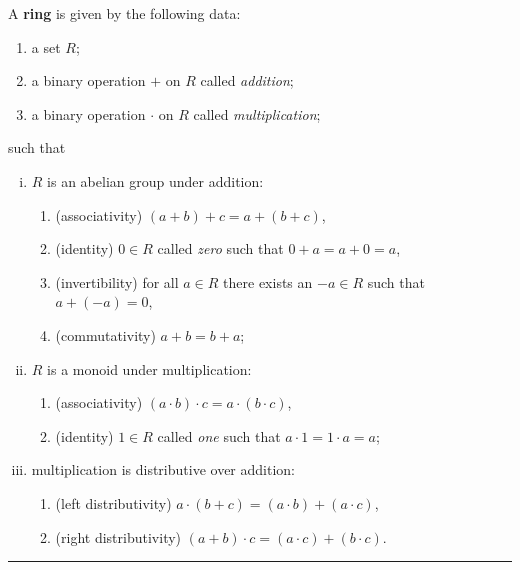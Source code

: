 \documentclass[12pt]{article}
\newcommand{\keyword}[1]{\textbf{#1}}
\newcommand{\sepline}{\rule{\textwidth}{0.4pt}}
\theoremstyle{definition}
\newcommand{\<}{\left\langle}
\renewcommand{\>}{\right\rangle}
\begin{document}
A \keyword{ring} is given by the following data:
\begin{enumerate}[(1)]
    \item a set $R$;
    \item a binary operation $+$ on $R$ called \emph{addition};
    \item a binary operation $\cdot$ on $R$ called \emph{multiplication};
\end{enumerate}
such that
\begin{enumerate}[(i)]
    \item $R$ is an abelian group under addition:
    \begin{enumerate}
        \item (associativity) $(a + b) + c = a + (b + c)$,
        \item (identity) $0 \in R$ called \emph{zero} such that $0 + a = a + 0 = a$,
        \item (invertibility) for all $a \in R$ there exists an $-a \in R$ such that $a + (-a) = 0$,
        \item (commutativity) $a + b = b + a$;
    \end{enumerate}
    \item $R$ is a monoid under multiplication:
    \begin{enumerate}
        \item (associativity) $(a \cdot b) \cdot c = a \cdot (b \cdot c)$,
        \item (identity) $1 \in R$ called \emph{one} such that $a \cdot 1 = 1 \cdot a = a$;
    \end{enumerate}
    \item multiplication is distributive over addition:
    \begin{enumerate}
        \item (left distributivity) $a \cdot (b + c) = (a \cdot b) + (a \cdot c)$,
        \item (right distributivity) $(a + b) \cdot c = (a \cdot c) + (b \cdot c)$.
    \end{enumerate}
\end{enumerate}

\sepline
\end{document}
